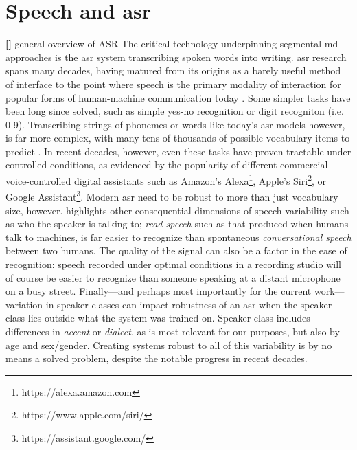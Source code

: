 \documentclass[thesis]{cluu}
\newcounter{paranum}
\newcommand{\numberedparagraph}{\par\refstepcounter{paranum}\textbf{[\theparanum] }}
\begin{document}
\section{Speech and \acrfull{asr}}
\numberedparagraph{general overview of ASR}
The critical technology underpinning segmental \gls{md} approaches is the \gls{asr} system transcribing spoken words into writing. \gls{asr} research spans many decades, having matured from its origins as a barely useful method of interface to the point where speech is the primary modality of interaction for popular forms of human-machine communication today \parencite{yuAutomaticSpeechRecognition2015}. Some simpler tasks have been long since solved, such as simple yes-no recognition or digit recogniton (i.e. 0-9). Transcribing strings of phonemes or words like today's \gls{asr} models however, is far more complex, with many tens of thousands of possible vocabulary items to predict \parencite{jurafskySpeechLanguageProcessing2025}. In recent decades, however, even these tasks have proven tractable under controlled conditions, as evidenced by the popularity of different commercial voice-controlled digital assistants such as Amazon's Alexa\footnote{https://alexa.amazon.com}, Apple's Siri\footnote{https://www.apple.com/siri/}, or Google Assistant\footnote{https://assistant.google.com/}. Modern \gls{asr} need to be robust to more than just vocabulary size, however. \textcite{jurafskySpeechLanguageProcessing2025} highlights other consequential dimensions of speech variability such as who the speaker is talking to; \textit{read speech} such as that produced when humans talk to machines, is far easier to recognize than spontaneous \textit{conversational speech} between two humans. The quality of the signal can also be a factor in the ease of recognition: speech recorded under optimal conditions in a recording studio will of course be easier to recognize than someone speaking at a distant microphone on a busy street. Finally---and perhaps most importantly for the current work---variation in speaker classes can impact robustness of an \gls{asr} when the speaker class lies outside what the system was trained on. Speaker class includes differences in \textit{accent} or \textit{dialect}, as is most relevant for our purposes, but also by age and sex/gender. Creating systems robust to all of this variability is by no means a solved problem, despite the notable progress in recent decades.
\end{document}
